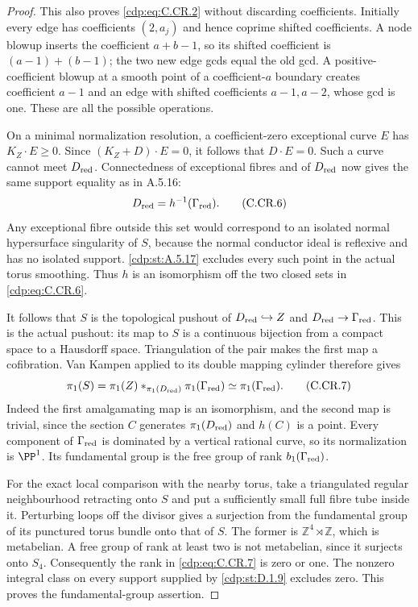 \begin{proof}
This also proves \eqref{cdp:eq:C.CR.2} without discarding coefficients.
Initially every edge has coefficients $(2,a_j)$ and hence
coprime shifted coefficients. A node blowup inserts the
coefficient $a+b-1$, so its shifted coefficient is
$(a-1)+(b-1)$; the two new edge gcds equal the old gcd.
A positive-coefficient blowup at a smooth point of a
coefficient-$a$ boundary creates coefficient $a-1$ and
an edge with shifted coefficients $a-1,a-2$, whose gcd
is one. These are all the possible operations.

On a minimal normalization resolution, a coefficient-zero
exceptional curve $E$ has $K_Z\cdot E\ge0$. Since
$(K_Z+D)\cdot E=0$, it follows that $D\cdot E=0$.
Such a curve cannot meet $D_{\rm red}$. Connectedness of
exceptional fibres and of $D_{\rm red}$ now gives the same
support equality as in A.5.16:
\[
 D_{\rm red}=h^{-1}(\Gamma_{\rm red}).
\tag{C.CR.6}\label{cdp:eq:C.CR.6}
\]
Any exceptional fibre outside this set would correspond to
an isolated normal hypersurface singularity of $S$, because
the normal conductor ideal is reflexive and has no isolated
support. \ref{cdp:st:A.5.17} excludes every such point in the actual
torus smoothing. Thus $h$ is an isomorphism off the two
closed sets in \eqref{cdp:eq:C.CR.6}.

It follows that $S$ is the topological pushout of
$D_{\rm red}\hookrightarrow Z$ and
$D_{\rm red}\to\Gamma_{\rm red}$. This is the actual
pushout: its map to $S$ is a continuous bijection from a
compact space to a Hausdorff space. Triangulation of the
pair makes the first map a cofibration. Van Kampen applied
to its double mapping cylinder therefore gives
\[
 \pi_1(S)=\pi_1(Z)*_{\pi_1(D_{\rm red})}
                         \pi_1(\Gamma_{\rm red})
          \simeq\pi_1(\Gamma_{\rm red}).
\tag{C.CR.7}\label{cdp:eq:C.CR.7}
\]
Indeed the first amalgamating map is an isomorphism, and
the second map is trivial, since the section $C$ generates
$\pi_1(D_{\rm red})$ and $h(C)$ is a point. Every component
of $\Gamma_{\rm red}$ is dominated by a vertical rational
curve, so its normalization is $\PP^1$. Its fundamental
group is the free group of rank $b_1(\Gamma_{\rm red})$.

For the exact local comparison with the nearby torus, take
a triangulated regular neighbourhood retracting onto $S$
and put a sufficiently small full fibre tube inside it.
Perturbing loops off the divisor gives a surjection from
the fundamental group of its punctured torus bundle onto
that of $S$. The former is $\mathbb Z^4\rtimes\mathbb Z$,
which is metabelian. A free group of rank at least two
is not metabelian, since it surjects onto $S_4$.
Consequently the rank in \eqref{cdp:eq:C.CR.7} is zero or one. The
nonzero integral class on every support supplied by \ref{cdp:st:D.1.9}
excludes zero. This proves the fundamental-group assertion.


\end{proof}
